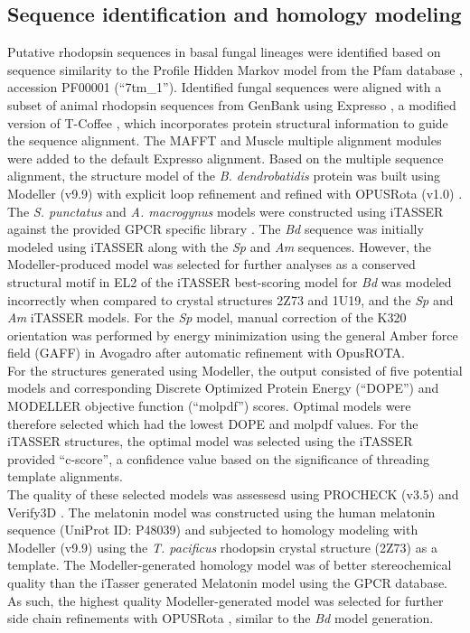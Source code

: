 \subsection*{Sequence identification and homology modeling}
Putative rhodopsin sequences in basal fungal lineages were identified based on sequence similarity to the Profile Hidden Markov model from the Pfam database \cite{Finn2014}, accession PF00001 (\enquote{7tm\_1}). Identified fungal sequences were aligned with a subset of animal rhodopsin sequences from GenBank using Expresso \cite{Armougom2006}, a modified version of T-Coffee \cite{Notredame2000}, which incorporates protein structural information to guide the sequence alignment. The MAFFT \cite{Katoh2002,Katoh2005} and Muscle \cite{Edgar2004} multiple alignment modules were added to the default Expresso alignment. Based on the multiple sequence alignment, the structure model of the \textit{B. dendrobatidis} protein was built using Modeller (v9.9) \cite{Eswar2007} with explicit loop refinement and refined with OPUSRota (v1.0) \cite{Lu2008}. The \textit{S. punctatus} and \textit{A. macrogynus} models were constructed using iTASSER against the provided GPCR specific library \cite{Zhang2008}. The \textit{Bd} sequence was initially modeled using iTASSER along with the \textit{Sp} and \textit{Am} sequences. However, the Modeller-produced model was selected for further analyses as a conserved structural motif in EL2 of the iTASSER best-scoring model for \textit{Bd} was modeled incorrectly when compared to crystal structures 2Z73 and 1U19, and the \textit{Sp} and \textit{Am} iTASSER models. For the \textit{Sp} model, manual correction of the K320 orientation was performed by energy minimization using the general Amber force field (GAFF) \cite{Wang2004} in Avogadro \cite{Hanwell2012} after automatic refinement with OpusROTA.\\ 
\indent For the structures generated using Modeller, the output consisted of five potential models and corresponding Discrete Optimized Protein Energy (\enquote{DOPE}) \cite{Shen2006} and MODELLER objective function (\enquote{molpdf}) scores. Optimal models were therefore selected which had the lowest DOPE and molpdf values. For the iTASSER structures, the optimal model was selected using the iTASSER provided \enquote{c-score}, a confidence value based on the significance of threading template alignments.\\
\indent The quality of these selected models was assessesd using PROCHECK (v3.5) \cite{Laskowski1993,Wiederstein2007} and Verify3D \cite{Luthy1992}. The melatonin model was constructed using the human melatonin sequence (UniProt ID: P48039) and subjected to homology modeling with Modeller (v9.9) \cite{Eswar2007} using the \textit{T. pacificus} rhodopsin crystal structure (2Z73) as a template. The Modeller-generated homology model was of better stereochemical quality than the iTasser generated Melatonin model using the GPCR database. As such, the highest quality Modeller-generated model was selected for further side chain refinements with OPUSRota \cite{Lu2008}, similar to the \textit{Bd} model generation.\\
